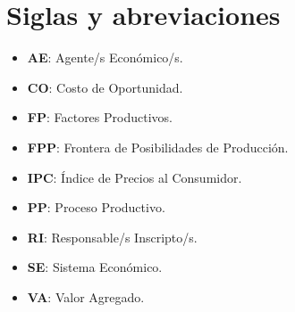 \documentclass[10pt,a4paper]{article}
\begin{document}
\newpage
\section*{Siglas y abreviaciones}

\begin{itemize}
\item \textbf{AE}: Agente/s Económico/s.
\item \textbf{CO}: Costo de Oportunidad.
\item \textbf{FP}: Factores Productivos.
\item \textbf{FPP}: Frontera de Posibilidades de Producción.
\item \textbf{IPC}: Índice de Precios al Consumidor.
\item \textbf{PP}: Proceso Productivo.
\item \textbf{RI}: Responsable/s Inscripto/s.
\item \textbf{SE}: Sistema Económico.
\item \textbf{VA}: Valor Agregado.
\end{itemize}

\newpage
\end{document}
